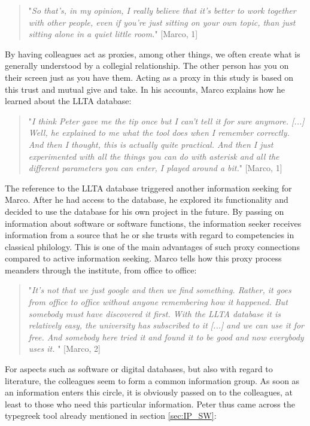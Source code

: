 \documentclass[12pt, a4paper, titlepage, oneside, abstract=true, toc=listof, toc=bibliography]{scrreprt}
\begin{document}
{%
\begin{quotation}
"\textit{So that's, in my opinion, I really believe that it's better to work together with other people, even if you're just sitting on your own topic, than just sitting alone in a quiet little room.}" [Marco, 1]
\end{quotation} 

By having colleagues act as proxies, among other things, we often create what is generally understood by a collegial relationship. The other person has you on their screen just as you have them. Acting as a proxy in this study is based on this trust and mutual give and take. In his accounts, Marco explains how he learned about the LLTA database:

\begin{quotation}
"\textit{I think Peter gave me the tip once but I can't tell it for sure anymore. [...] Well, he explained to me what the tool does when I remember correctly. And then I thought, this is actually quite practical. And then I just experimented with all the things you can do with asterisk and all the different parameters you can enter, I played around a bit.}" [Marco, 1]
\end{quotation}

The reference to the LLTA database triggered another information seeking for Marco. After he had access to the database, he explored its functionality and decided to use the database for his own project in the future. By passing on information about software or software functions, the information seeker receives information from a source that he or she trusts with regard to competencies in classical philology. This is one of the main advantages of such proxy connections compared to active information seeking. Marco tells how this proxy process meanders through the institute, from office to office:

\begin{quotation}
"\textit{It's not that we just google and then we find something. Rather, it goes from office to office without anyone remembering how it happened. But somebody must have discovered it first. With the LLTA database it is relatively easy, the university has subscribed to it [...] and we can use it for free. And somebody here tried it and found it to be good and now everybody uses it.} " [Marco, 2]
\end{quotation}

For aspects such as software or digital databases, but also with regard to literature, the colleagues seem to form a common information group. As soon as an information enters this circle, it is obviously passed on to the colleagues, at least to those who need this particular information. Peter thus came across the typegreek tool already mentioned in section \ref{sec:IP_SW}:

}
\end{document}
